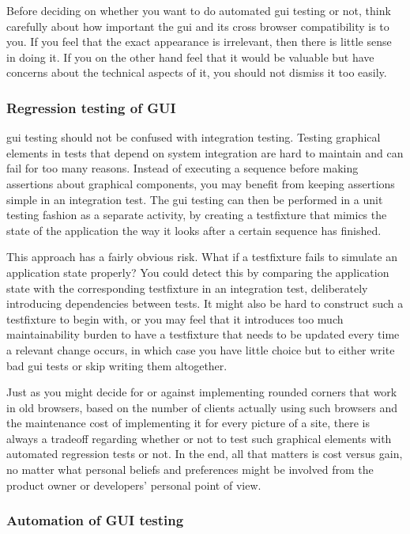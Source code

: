 \documentclass[11pt]{article}
\begin{document}
Before deciding on whether you want to do automated \gls{gui} testing or not, think carefully about how important the \gls{gui} and its cross browser compatibility is to you. If you feel that the exact appearance is irrelevant, then there is little sense in doing it. If you on the other hand feel that it would be valuable but have concerns about the technical aspects of it, you should not dismiss it too easily.

\subsubsection{Regression testing of GUI}

\gls{gui} testing should not be confused with integration testing. Testing graphical elements in tests that depend on system integration are hard to maintain and can fail for too many reasons. Instead of executing a sequence before making assertions about graphical components, you may benefit from keeping assertions simple in an integration test. The \gls{gui} testing can then be performed in a unit testing fashion as a separate activity, by creating a \gls{testfixture} that mimics the state of the application the way it looks after a certain sequence has finished.

This approach has a fairly obvious risk. What if a \gls{testfixture} fails to simulate an application state properly? You could detect this by comparing the application state with the corresponding \gls{testfixture} in an integration test, deliberately introducing dependencies between tests. It might also be hard to construct such a \gls{testfixture} to begin with, or you may feel that it introduces too much maintainability burden to have a \gls{testfixture} that needs to be updated every time a relevant change occurs, in which case you have little choice but to either write bad \gls{gui} tests or skip writing them altogether.

Just as you might decide for or against implementing rounded corners that work in old browsers, based on the number of clients actually using such browsers and the maintenance cost of implementing it for every picture of a site, there is always a tradeoff regarding whether or not to test such graphical elements with automated regression tests or not. In the end, all that matters is cost versus gain, no matter what personal beliefs and preferences might be involved from the product owner or developers' personal point of view. \cite[questions~40-44]{Ahnve}

\subsubsection{Automation of GUI testing}
\end{document}
